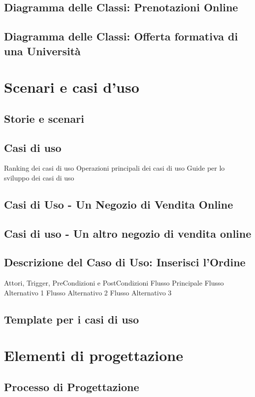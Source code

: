 \documentclass{article}
\begin{document}
	\subsection{Diagramma delle Classi: Prenotazioni Online}
	\subsection{Diagramma delle Classi: Offerta formativa di una Università}
	
	\section{Scenari e casi d’uso}
	\subsection{Storie e scenari}
	\subsection{Casi di uso}
	Ranking dei casi di uso
	Operazioni principali dei casi di uso
	Guide per lo sviluppo dei casi di uso
	\subsection{Casi di Uso - Un Negozio di Vendita Online}
	\subsection{Casi di uso - Un altro negozio di vendita online}
	\subsection{Descrizione del Caso di Uso: Inserisci l’Ordine}
	Attori, Trigger, PreCondizioni e PostCondizioni
	Flusso Principale
	Flusso Alternativo 1
	Flusso Alternativo 2
	Flusso Alternativo 3
	\subsection{Template per i casi di uso}
	
	\section{Elementi di progettazione}
	\subsection{Processo di Progettazione}
\end{document}
